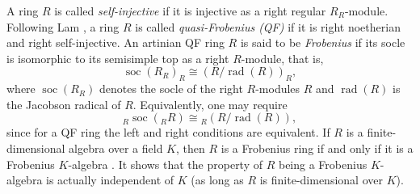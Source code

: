 \documentclass[11pt,reqno]{amsart}
\theoremstyle{plain}
\newtheorem{lem}[thm]{Lemma}
\theoremstyle{remark}
\theoremstyle{definition}
\newcommand{\soc}{\mathop{\mathrm{soc}}\nolimits}
\newcommand{\rad}{\mathop{\mathrm{rad}}\nolimits}
\begin{document}
%
%
%
%
%

A ring $R$ is called \emph{self-injective} if it is injective as a right regular $R_R$-module.
Following Lam \cite[Ch.~15--16]{LamTY}, a ring $R$ is called
\emph{quasi-Frobenius (QF)} if it is right noetherian and right self-injective.
An artinian QF ring $R$ is said to be \emph{Frobenius} if its socle
is isomorphic to its semisimple top as a right $R$-module, that is,
\[
\soc(R_R)_R \cong (R/\rad(R))_R,
\]
where $\soc(R_R)$ denotes the socle of the right $R$-modules $R$ and $\rad(R)$ is the Jacobson radical of $R$.
Equivalently, one may require
\[
{}_R\soc({}_R R) \cong {}_R(R/\rad(R)),
\]
since for a QF ring the left and right conditions are equivalent.
If $R$ is a finite-dimensional algebra over a field $K$, then
$R$ is a Frobenius ring if and only if it is a Frobenius $K$-algebra
\cite[Theorem~16.21]{LamTY}.  It shows that the
property of $R$ being a Frobenius $K$-algebra is actually independent of $K$
(as long as $R$ is finite-dimensional over $K$).
\end{document}
